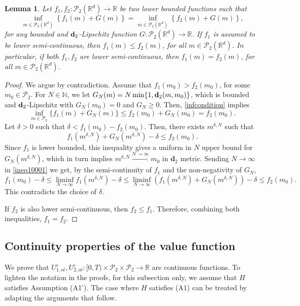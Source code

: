 \documentclass[reqno,11pt]{amsart}
\newtheorem{lemma}[theorem]{Lemma}
\numberwithin{equation}{section}
\newcommand{\be}{\begin{equation}}
\newcommand{\ee}{\end{equation}}
\newcommand{\R}{\mathbb{R}} %
\newcommand{\e}{\varepsilon}
\newcommand{\nd}{\noindent}
\begin{document}
\begin{lemma}\label{infeq}
    Let $f_1,f_2\colon\mathcal{P}_2(\R^d)\to \R$ be two lower bounded functions such that
    \be\label{infcondition}
\inf_{m\in\mathcal{P}_2(\R^d)}\left\{ f_1(m)+G(m)\right\}=\inf_{m\in\mathcal{P}_2(\R^d)}\left\{ f_2(m)+G(m)\right\},
    \ee
    for any bounded and ${\bf d}_2$-Lipschitz function $G\colon \mathcal{P}_2(\R^d)\to \R$. If $f_1$ is assumed to be lower semi-continuous, then $f_1(m)\le f_2(m)$, for all $m\in \mathcal{P}_2(\R^d)$. In particular, if both $f_1,f_2$ are lower semi-continuous, then $f_1(m)=f_2(m)$, for all $m\in \mathcal{P}_2(\R^d)$.
\end{lemma}

\begin{proof}
    We argue by contradiction. Assume that $f_1(m_0)>f_2(m_0)$, for some $m_0\in \mathcal{P}_2$. For $N\in \mathbb{N}$, we let $G_N(m)=N\min\{1,{\bf d}_2(m,m_0)\}$, which is bounded and ${\bf d}_2$-Lipschitz with $G_N(m_0)=0$ and $G_{N} \ge 0$. Then, \eqref{infcondition} implies
    $$\inf_{m\in \mathcal{P}_2}\{f_1(m)+G_N(m)\}\le f_2(m_0)+G_N(m_0)=f_2(m_0).$$
    Let $\delta>0$ such that $\delta<f_1(m_0)-f_2(m_0)$. Then, there exists $m^{\delta,N}$ such that
    \be\label{ineq10001}
    f_1(m^{\delta,N})+G_N(m^{\delta,N})-\delta\le f_2(m_0).
    \ee
    Since $f_1$ is lower bounded, this inequality gives a uniform in $N$ upper bound for $G_N(m^{\delta,N})$, which in turn implies $m^{\delta,N}\xrightarrow{N\to \infty}m_0$ in $\textbf{d}_2$ metric. Sending $N\to \infty$ in \eqref{ineq10001} we get, by the semi-continuity of $f_1$ and the non-negativity of $G_N$,
    $$f_1(m_0)-\delta\le \liminf_{N\to \infty} f_1(m^{\delta,N})-\delta\le \liminf_{N\to \infty} (f_1(m^{\delta,N})+G_N(m^{\delta,N}))-\delta \le f_2(m_0).$$
    This contradicts the choice of $\delta$.
    \vspace{2mm}

    \nd
    If $f_2$ is also lower semi-continuous, then $f_2\le f_1$. Therefore, combining both inequalities, $f_1=f_2$.
\end{proof}

\subsection{Continuity properties of the value function}\label{DOTcont}
We prove that $U^\e_{1,ot},U^\e_{2,ot}\colon [0,T)\times \mathcal{P}_2\times\mathcal{P}_2\to \R$ are continuous functions. To lighten the notation in the proofs, for this subsection only, we assume that $H$ satisfies Assumption (A1'). The case where $H$ satisfies (A1) can be treated by adapting the arguments that follow.
\vspace{2mm}
\end{document}
